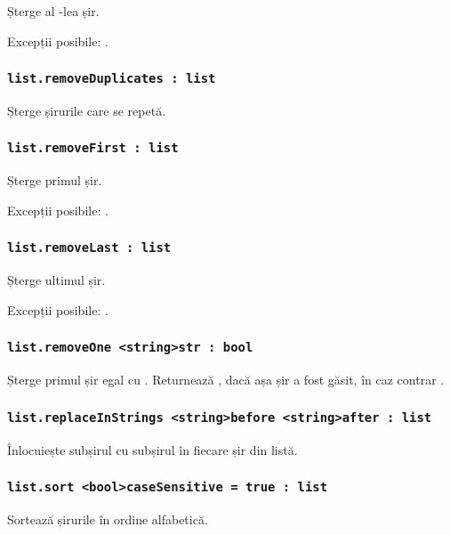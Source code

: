 Șterge al -lea șir.

Excepții posibile: .

\subsubsection{\lstinline|list.removeDuplicates : list|}

Șterge șirurile care se repetă.

\subsubsection{\lstinline|list.removeFirst : list|}

Șterge primul șir.

Excepții posibile: .

\subsubsection{\lstinline|list.removeLast : list|}

Șterge ultimul șir.

Excepții posibile: .

\subsubsection{\lstinline|list.removeOne <string>str : bool|}

Șterge primul șir egal cu . Returnează \true, dacă așa șir a fost găsit, în caz contrar \false.

\subsubsection{\lstinline|list.replaceInStrings <string>before <string>after : list|}

Înlocuiește subșirul  cu subșirul  în fiecare șir din listă.

\subsubsection{\lstinline|list.sort <bool>caseSensitive = true : list|}

Sortează șirurile în ordine alfabetică.


